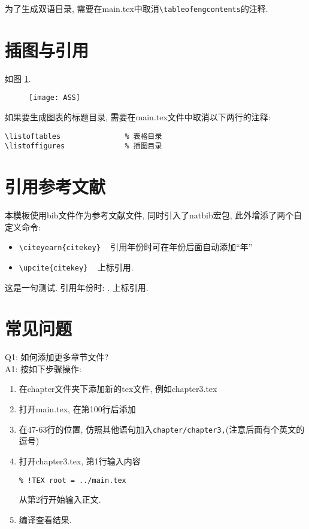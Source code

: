 为了生成双语目录, 需要在main.tex中取消\verb|\tableofengcontents|的注释.


\section{插图与引用}
如图 \ref{fig:ASS}.
\begin{figure}[h]
	\centering
	\texttt{[image: ASS]}
	\label{fig:ASS}
\end{figure}

如果要生成图表的标题目录, 需要在main.tex文件中取消以下两行的注释:
\begin{verbatim}
\listoftables               % 表格目录
\listoffigures              % 插图目录
\end{verbatim}

\section{引用参考文献}
本模板使用bib文件作为参考文献文件, 同时引入了natbib宏包, 此外增添了两个自定义命令:
\begin{itemize}
\item \verb|\citeyearn{citekey}|  ~  引用年份时可在年份后面自动添加``年''
\item \verb|\upcite{citekey}| ~ 上标引用.
\end{itemize}

这是一句测试\cite{Hazay_2010_Efficient}. 引用年份时: . 上标引用.

\section{常见问题}
Q1: 如何添加更多章节文件?\\
A1: 按如下步骤操作:
\begin{enumerate}
\item 在chapter文件夹下添加新的tex文件, 例如chapter3.tex
\item 打开main.tex, 在第100行后添加\verb||
\item 在47-63行的位置, 仿照其他语句加入\verb|chapter/chapter3,|(注意后面有个英文的逗号)
\item 打开chapter3.tex, 第1行输入内容
\begin{verbatim}
% !TEX root = ../main.tex
\end{verbatim}
从第2行开始输入正文.
\item 编译查看结果.
\end{enumerate}


